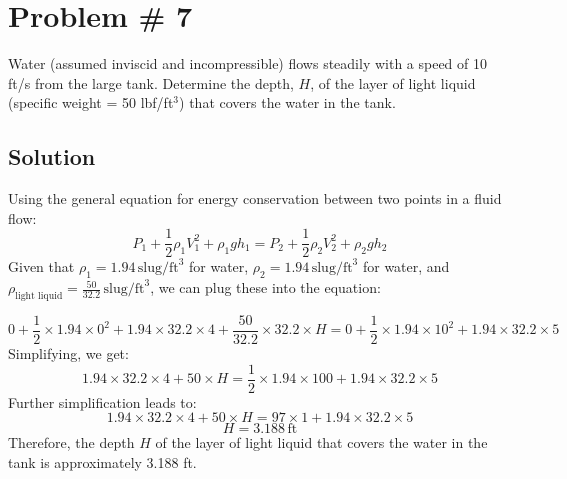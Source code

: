 \documentclass{article}
\begin{document}
\newpage
\section*{Problem \# 7}
Water (assumed inviscid and incompressible) flows steadily with a speed of 10 ft/s from the large tank. Determine the depth, \( H \), of the layer of light liquid (specific weight = 50 lbf/ft\(^3\)) that covers the water in the tank.

\subsection*{Solution}

Using the general equation for energy conservation between two points in a fluid flow:
\[
P_1 + \frac{1}{2} \rho_1 V_1^2 + \rho_1 g h_1 = P_2 + \frac{1}{2} \rho_2 V_2^2 + \rho_2 g h_2
\]
Given that \( \rho_1 = 1.94 \, \text{slug/ft}^3 \) for water, \( \rho_2 = 1.94 \, \text{slug/ft}^3 \) for water, and \( \rho_{\text{light liquid}} = \frac{50}{32.2} \, \text{slug/ft}^3 \), we can plug these into the equation:

\[
0 + \frac{1}{2} \times 1.94 \times 0^2 + 1.94 \times 32.2 \times 4 + \frac{50}{32.2} \times 32.2 \times H = 0 + \frac{1}{2} \times 1.94 \times 10^2 + 1.94 \times 32.2 \times 5
\]
Simplifying, we get:
\[
1.94 \times 32.2 \times 4 + 50 \times H = \frac{1}{2} \times 1.94 \times 100 + 1.94 \times 32.2 \times 5
\]
Further simplification leads to:
\[
1.94 \times 32.2 \times 4 + 50 \times H = 97 \times 1 + 1.94 \times 32.2 \times 5
\]
\[
H = 3.188 \, \text{ft}
\]
Therefore, the depth \( H \) of the layer of light liquid that covers the water in the tank is approximately 3.188 ft.

\newpage
\end{document}
